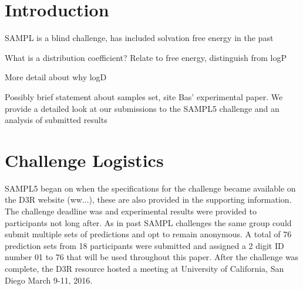 \date{Received: date / Accepted: date}


\maketitle

\begin{abstract}
\end{abstract}



\section{Introduction}
\label{intro}
SAMPL is a blind challenge, has included solvation free energy in the past

What is a distribution coefficient? Relate to free energy, distinguish from logP

More detail about why logD

Possibly brief statement about samples set, site Bas' experimental paper. We provide a detailed look at our submissions to the SAMPL5 challenge and an analysis of submitted results


\section{Challenge Logistics}
\label{logistics}
SAMPL5 began on %
when the specifications for the challenge became available on the D3R website (ww...), these are also provided in the supporting information.  %
The challenge deadline was %
and experimental results were provided to participants not long after. 
As in past SAMPL challenges the same group could submit multiple sets of predictions and opt to remain anonymous. 
A total of 76 prediction sets from 18 participants were submitted and assigned a 2 digit ID number 01 to 76 that will be used throughout this paper. 
After the challenge was complete, the D3R resource hosted a meeting at University of California, San Diego March 9-11, 2016. %

